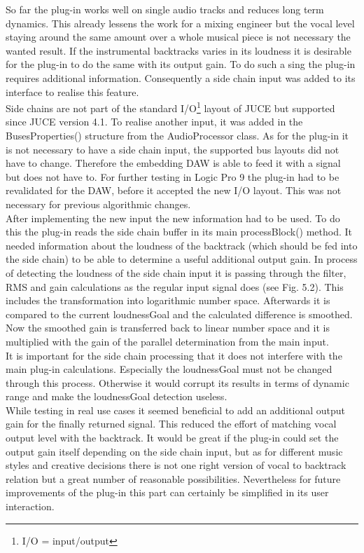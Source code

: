 So far the plug-in works well on single audio tracks and reduces long term dynamics. This already lessens the work for a mixing engineer but the vocal level staying around the same amount over a whole musical piece is not necessary the wanted result. If the instrumental backtracks varies in its loudness it is desirable for the plug-in to do the same with its output gain. To do such a sing the plug-in requires additional information. Consequently a side chain input was added to its interface to realise this feature.\\
Side chains are not part of the standard I/O\footnote{I/O = input/output} layout of JUCE but supported since JUCE version 4.1. To realise another input, it was added in the BusesProperties() structure from the AudioProcessor class. As for the plug-in it is not necessary to have a side chain input, the supported bus layouts did not have to change. Therefore the embedding DAW is able to feed it with a signal but does not have to. For further testing in Logic Pro 9 the plug-in had to be revalidated for the DAW, before it accepted the new I/O layout. This was not necessary for previous algorithmic changes.\\
After implementing the new input the new information had to be used. To do this the plug-in reads the side chain buffer in its main processBlock() method. It needed information about the loudness of the backtrack (which should be fed into the side chain) to be able to determine a useful additional output gain. In process of detecting the loudness of the side chain input it is passing through the filter, RMS and gain calculations as the regular input signal does (see Fig. 5.2). This includes the transformation into logarithmic number space. Afterwards it is compared to the current loudnessGoal and the calculated difference is smoothed. Now the smoothed gain is transferred back to linear number space and it is multiplied with the gain of the parallel determination from the main input.\\
It is important for the side chain processing that it does not interfere with the main plug-in calculations. Especially the loudnessGoal must not be changed through this process. Otherwise it would corrupt its results in terms of dynamic range and make the loudnessGoal detection useless.\\
While testing in real use cases it seemed beneficial to add an additional output gain for the finally returned signal. This reduced the effort of matching vocal output level with the backtrack. It would be great if the plug-in could set the output gain itself depending on the side chain input, but as for different music styles and creative decisions there is not one right version of vocal to backtrack relation but a great number of reasonable possibilities. Nevertheless for future improvements of the plug-in this part can certainly be simplified in its user interaction.\\
